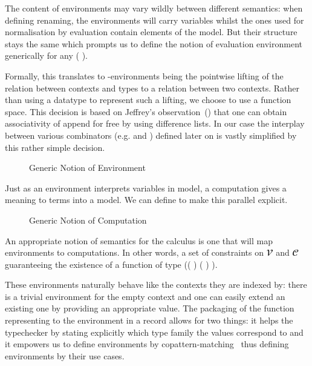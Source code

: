 The content of environments may vary wildly between different semantics:
when defining renaming, the environments will carry variables whilst the
ones used for normalisation by evaluation contain elements of the model.
But their structure stays the same which prompts us to define the notion
of evaluation environment generically for any ( ).

Formally, this translates to -environments being the
pointwise lifting of the relation  between contexts and types to a
relation between two contexts. Rather than using a datatype to represent
such a lifting, we choose to use a function space. This decision is based
on Jeffrey's observation~(\citeyear{jeffrey2011assoc}) that one can obtain
associativity of append for free by using difference lists. In our case the
interplay between various combinators (e.g.  and )
defined later on is vastly simplified by this rather simple decision.

\begin{figure}[h]
\caption{Generic Notion of Environment\label{fig:env}}
\end{figure}

Just as an environment interprets variables in model, a computation gives a meaning
to terms into a model. We can define  to make this parallel explicit.

\begin{figure}[h]
\caption{Generic Notion of Computation\label{fig:comp}}
\end{figure}

An appropriate notion of semantics for the calculus is one that
will map environments to computations. In other words, a set of
constraints on $𝓥$ and $𝓒$ guaranteeing the existence of a function
of type (( )    ( )  ).

These environments naturally behave like the contexts they are indexed by:
there is a trivial environment for the empty context and one can easily
extend an existing one by providing an appropriate value. The packaging of
the function representing to the environment in a record allows for two
things: it helps the typechecker by stating explicitly which type family
the values correspond to and it empowers us to define environments by
copattern-matching~\cite{abel2013copatterns} thus defining environments
by their use cases.


